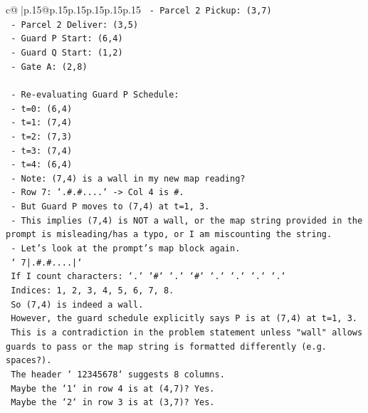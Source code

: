 \documentclass{article}
\begin{document}
{\begin{supertabular}{c@{$\;$}|p{.15\linewidth}@{}p{.15\linewidth}p{.15\linewidth}p{.15\linewidth}p{.15\linewidth}p{.15\linewidth}}
{{{\texttt{          {-} Parcel 2 Pickup: (3,7)} \\
\texttt{          {-} Parcel 2 Deliver: (3,5)} \\
\texttt{          {-} Guard P Start: (6,4)} \\
\texttt{          {-} Guard Q Start: (1,2)} \\
\texttt{          {-} Gate A: (2,8)} \\
\\ 
\texttt{        {-} Re{-}evaluating Guard P Schedule:} \\
\texttt{          {-} t=0: (6,4)} \\
\texttt{          {-} t=1: (7,4)} \\
\texttt{          {-} t=2: (7,3)} \\
\texttt{          {-} t=3: (7,4)} \\
\texttt{          {-} t=4: (6,4)} \\
\texttt{          {-} Note: (7,4) is a wall in my new map reading?} \\
\texttt{            {-} Row 7: `.\#.\#....` {-}> Col 4 is \#.} \\
\texttt{            {-} But Guard P moves to (7,4) at t=1, 3.} \\
\texttt{            {-} This implies (7,4) is NOT a wall, or the map string provided in the prompt is misleading/has a typo, or I am miscounting the string.} \\
\texttt{            {-} Let's look at the prompt's map block again.} \\
\texttt{              ` 7|.\#.\#....|`} \\
\texttt{              If I count characters: `.` `\#` `.` `\#` `.` `.` `.` `.`} \\
\texttt{              Indices: 1, 2, 3, 4, 5, 6, 7, 8.} \\
\texttt{              So (7,4) is indeed a wall.} \\
\texttt{              However, the guard schedule explicitly says P is at (7,4) at t=1, 3.} \\
\texttt{              This is a contradiction in the problem statement unless "wall" allows guards to pass or the map string is formatted differently (e.g. spaces?).} \\
\texttt{              The header ` 12345678` suggests 8 columns.} \\
\texttt{              Maybe the `1` in row 4 is at (4,7)? Yes.} \\
\texttt{              Maybe the `2` in row 3 is at (3,7)? Yes.} \\
}}}
\end{supertabular}}
\end{document}

